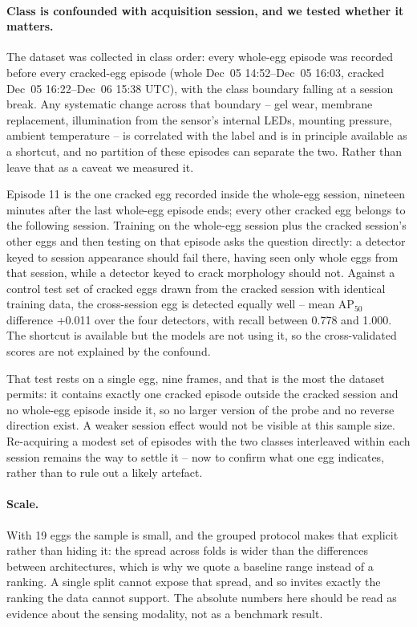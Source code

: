 \paragraph{Class is confounded with acquisition session, and we tested whether it matters.}
The dataset was collected in class order: every whole-egg episode was recorded before every
cracked-egg episode (whole Dec~05 14:52--Dec~05 16:03, cracked Dec~05 16:22--Dec~06 15:38
UTC), with the class boundary falling at a session break. Any systematic change across that
boundary -- gel wear, membrane replacement, illumination from the sensor's internal LEDs,
mounting pressure, ambient temperature -- is correlated with the label and is in principle
available as a shortcut, and no partition of these episodes can separate the two. Rather
than leave that as a caveat we measured it.

Episode 11 is the one cracked egg recorded inside the whole-egg session, nineteen minutes after
the last whole-egg episode ends; every other cracked egg belongs to the following session.
Training on the whole-egg session plus the cracked session's other eggs and then testing on
that episode asks the question directly: a detector keyed to session appearance should fail
there, having seen only whole eggs from that session, while a detector keyed to crack
morphology should not. Against a control test set of cracked eggs drawn from the cracked
session with identical training data, the cross-session egg is detected equally well -- mean
AP$_{50}$ difference +0.011 over the four detectors, with recall between 0.778 and 1.000. The
shortcut is available but the models are not using it, so the cross-validated scores are not
explained by the confound.

That test rests on a single egg, nine frames, and that is the most the dataset permits: it
contains exactly one cracked episode outside the cracked session and no whole-egg episode
inside it, so no larger version of the probe and no reverse direction exist. A weaker
session effect would not be visible at this sample size. Re-acquiring a modest set of
episodes with the two classes interleaved within each session remains the way to settle it
-- now to confirm what one egg indicates, rather than to rule out a likely artefact.

\paragraph{Scale.} With 19 eggs the sample is small, and the grouped protocol makes that
explicit rather than hiding it: the spread across folds is wider than the differences
between architectures, which is why we quote a baseline range instead of a ranking. A single
split cannot expose that spread, and so invites exactly the ranking the data cannot support.
The absolute numbers here should be read as evidence about the sensing modality, not as a
benchmark result.
